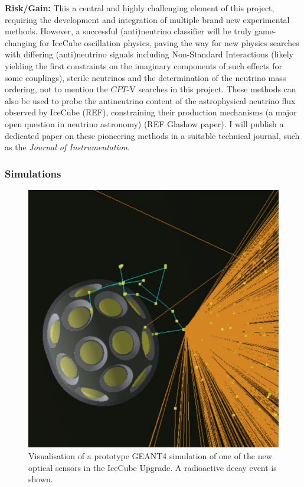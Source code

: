 \documentclass[a4paper,11pt]{article}
\begin{document}
\textbf{Risk/Gain:} This a central and highly challenging element of this project, requiring the development and integration of multiple brand new experimental methods. However, a successful (anti)neutrino classifier will be truly game-changing for IceCube oscillation physics, paving the way for new physics searches with differing (anti)neutrino signals including Non-Standard Interactions (likely yielding the first constraints on the imaginary components of such effects for some couplings), sterile neutrinos and the determination of the neutrino mass ordering, not to mention the $CPT$-V searches in this project. These methods can also be used to probe the antineutrino content of the astrophysical neutrino flux observed by IceCube (REF), constraining their production mechanisms (a major open question in neutrino astronomy) (REF Glashow paper). I will publish a dedicated paper on these pioneering methods in a suitable technical journal, such as the \textit{Journal of Instrumentation}. \\


\subsubsection{Simulations}

\begin{figure} %
    \centering
    \includegraphics[trim=0.0cm 0.0cm 0.cm 1.0cm, clip=true, width=\linewidth]{images/mDOM_noise.png}
    \caption{Visualisation of a prototype GEANT4 simulation of one of the new optical sensors in the IceCube Upgrade. A radioactive decay event is shown.}
    \label{fig:mDOM_sim}
\end{figure}
\end{document}
